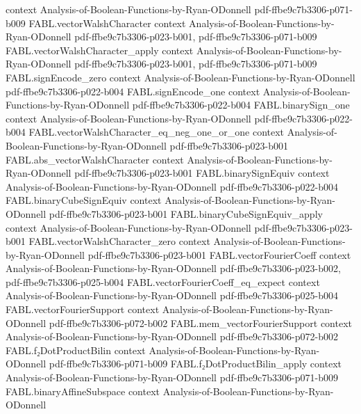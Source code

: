 \begin{theorem}
  {context}
  {Analysis-of-Boolean-Functions-by-Ryan-ODonnell}
  {pdf-ffbe9c7b3306-p071-b009}
\proofstep
  {FABL.vectorWalshCharacter}
  {context}
  {Analysis-of-Boolean-Functions-by-Ryan-ODonnell}
  {pdf-ffbe9c7b3306-p023-b001,
    pdf-ffbe9c7b3306-p071-b009}
\proofstep
  {FABL.vectorWalshCharacter_apply}
  {context}
  {Analysis-of-Boolean-Functions-by-Ryan-ODonnell}
  {pdf-ffbe9c7b3306-p023-b001,
    pdf-ffbe9c7b3306-p071-b009}
\proofstep
  {FABL.signEncode_zero}
  {context}
  {Analysis-of-Boolean-Functions-by-Ryan-ODonnell}
  {pdf-ffbe9c7b3306-p022-b004}
\proofstep
  {FABL.signEncode_one}
  {context}
  {Analysis-of-Boolean-Functions-by-Ryan-ODonnell}
  {pdf-ffbe9c7b3306-p022-b004}
\proofstep
  {FABL.binarySign_one}
  {context}
  {Analysis-of-Boolean-Functions-by-Ryan-ODonnell}
  {pdf-ffbe9c7b3306-p022-b004}
\proofstep
  {FABL.vectorWalshCharacter_eq_neg_one_or_one}
  {context}
  {Analysis-of-Boolean-Functions-by-Ryan-ODonnell}
  {pdf-ffbe9c7b3306-p023-b001}
\proofstep
  {FABL.abs_vectorWalshCharacter}
  {context}
  {Analysis-of-Boolean-Functions-by-Ryan-ODonnell}
  {pdf-ffbe9c7b3306-p023-b001}
\proofstep
  {FABL.binarySignEquiv}
  {context}
  {Analysis-of-Boolean-Functions-by-Ryan-ODonnell}
  {pdf-ffbe9c7b3306-p022-b004}
\proofstep
  {FABL.binaryCubeSignEquiv}
  {context}
  {Analysis-of-Boolean-Functions-by-Ryan-ODonnell}
  {pdf-ffbe9c7b3306-p023-b001}
\proofstep
  {FABL.binaryCubeSignEquiv_apply}
  {context}
  {Analysis-of-Boolean-Functions-by-Ryan-ODonnell}
  {pdf-ffbe9c7b3306-p023-b001}
\proofstep
  {FABL.vectorWalshCharacter_zero}
  {context}
  {Analysis-of-Boolean-Functions-by-Ryan-ODonnell}
  {pdf-ffbe9c7b3306-p023-b001}
\proofstep
  {FABL.vectorFourierCoeff}
  {context}
  {Analysis-of-Boolean-Functions-by-Ryan-ODonnell}
  {pdf-ffbe9c7b3306-p023-b002,
    pdf-ffbe9c7b3306-p025-b004}
\proofstep
  {FABL.vectorFourierCoeff_eq_expect}
  {context}
  {Analysis-of-Boolean-Functions-by-Ryan-ODonnell}
  {pdf-ffbe9c7b3306-p025-b004}
\proofstep
  {FABL.vectorFourierSupport}
  {context}
  {Analysis-of-Boolean-Functions-by-Ryan-ODonnell}
  {pdf-ffbe9c7b3306-p072-b002}
\proofstep
  {FABL.mem_vectorFourierSupport}
  {context}
  {Analysis-of-Boolean-Functions-by-Ryan-ODonnell}
  {pdf-ffbe9c7b3306-p072-b002}
\proofstep
  {FABL.f₂DotProductBilin}
  {context}
  {Analysis-of-Boolean-Functions-by-Ryan-ODonnell}
  {pdf-ffbe9c7b3306-p071-b009}
\proofstep
  {FABL.f₂DotProductBilin_apply}
  {context}
  {Analysis-of-Boolean-Functions-by-Ryan-ODonnell}
  {pdf-ffbe9c7b3306-p071-b009}
\proofstep
  {FABL.binaryAffineSubspace}
  {context}
  {Analysis-of-Boolean-Functions-by-Ryan-ODonnell}

\end{theorem}
